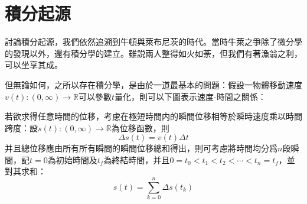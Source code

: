 \documentclass[12pt]{article}
\begin{document}
    \section*{積分起源}

    討論積分起源，我們依然追溯到牛頓與萊布尼茨的時代。當時牛萊之爭除了微分學的發現以外，還有積分學的建立。雖説兩人整得如火如荼，但我們有著漁翁之利，可以坐享其成。

    但無論如何，之所以存在積分學，是由於一道最基本的問題：假設一物體移動速度$v(t):(0,\infty)\to\mathbb{R}$可以參數$t$量化，則可以下圖表示速度-時間之關係：

    若欲求得任意時間的位移，考慮在極短時間内的瞬間位移相等於瞬時速度乘以時間跨度：設$s(t):(0,\infty)\to\mathbb{R}$為位移函數，則$$\Delta s(t)=v(t)\Delta t$$ 并且總位移應由所有所有瞬間的瞬間位移總和得出，則可考慮將時間均分爲$n$段瞬間，記$t=0$為初始時間及$t_f$為終結時間，并且$0=t_0<t_1<t_2<\cdots<t_n=t_f$，並對其求和：$$s(t)=\sum_{k=0}^{n}\Delta s(t_k)$$
\end{document}
